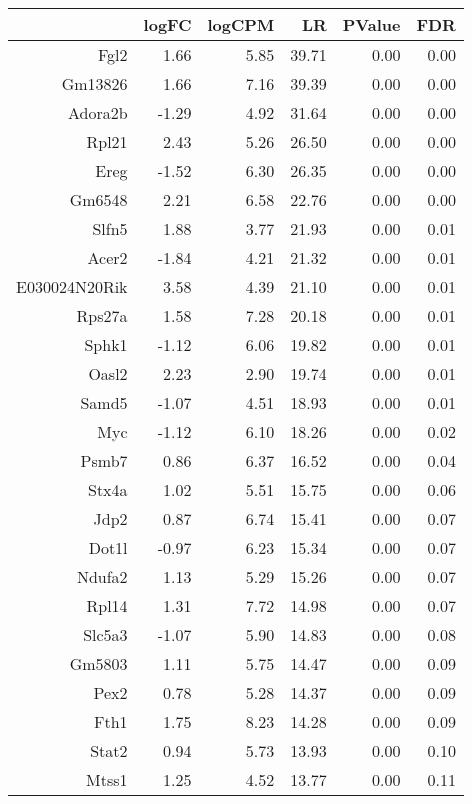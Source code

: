 \begin{table}[ht]
\centering
\begin{tabular}{rrrrrr}
  \hline
 & logFC & logCPM & LR & PValue & FDR \\ 
  \hline
Fgl2 & 1.66 & 5.85 & 39.71 & 0.00 & 0.00 \\ 
  Gm13826 & 1.66 & 7.16 & 39.39 & 0.00 & 0.00 \\ 
  Adora2b & -1.29 & 4.92 & 31.64 & 0.00 & 0.00 \\ 
  Rpl21 & 2.43 & 5.26 & 26.50 & 0.00 & 0.00 \\ 
  Ereg & -1.52 & 6.30 & 26.35 & 0.00 & 0.00 \\ 
  Gm6548 & 2.21 & 6.58 & 22.76 & 0.00 & 0.00 \\ 
  Slfn5 & 1.88 & 3.77 & 21.93 & 0.00 & 0.01 \\ 
  Acer2 & -1.84 & 4.21 & 21.32 & 0.00 & 0.01 \\ 
  E030024N20Rik & 3.58 & 4.39 & 21.10 & 0.00 & 0.01 \\ 
  Rps27a & 1.58 & 7.28 & 20.18 & 0.00 & 0.01 \\ 
  Sphk1 & -1.12 & 6.06 & 19.82 & 0.00 & 0.01 \\ 
  Oasl2 & 2.23 & 2.90 & 19.74 & 0.00 & 0.01 \\ 
  Samd5 & -1.07 & 4.51 & 18.93 & 0.00 & 0.01 \\ 
  Myc & -1.12 & 6.10 & 18.26 & 0.00 & 0.02 \\ 
  Psmb7 & 0.86 & 6.37 & 16.52 & 0.00 & 0.04 \\ 
  Stx4a & 1.02 & 5.51 & 15.75 & 0.00 & 0.06 \\ 
  Jdp2 & 0.87 & 6.74 & 15.41 & 0.00 & 0.07 \\ 
  Dot1l & -0.97 & 6.23 & 15.34 & 0.00 & 0.07 \\ 
  Ndufa2 & 1.13 & 5.29 & 15.26 & 0.00 & 0.07 \\ 
  Rpl14 & 1.31 & 7.72 & 14.98 & 0.00 & 0.07 \\ 
  Slc5a3 & -1.07 & 5.90 & 14.83 & 0.00 & 0.08 \\ 
  Gm5803 & 1.11 & 5.75 & 14.47 & 0.00 & 0.09 \\ 
  Pex2 & 0.78 & 5.28 & 14.37 & 0.00 & 0.09 \\ 
  Fth1 & 1.75 & 8.23 & 14.28 & 0.00 & 0.09 \\ 
  Stat2 & 0.94 & 5.73 & 13.93 & 0.00 & 0.10 \\ 
  Mtss1 & 1.25 & 4.52 & 13.77 & 0.00 & 0.11 \\ 

\end{tabular}
\end{table}
